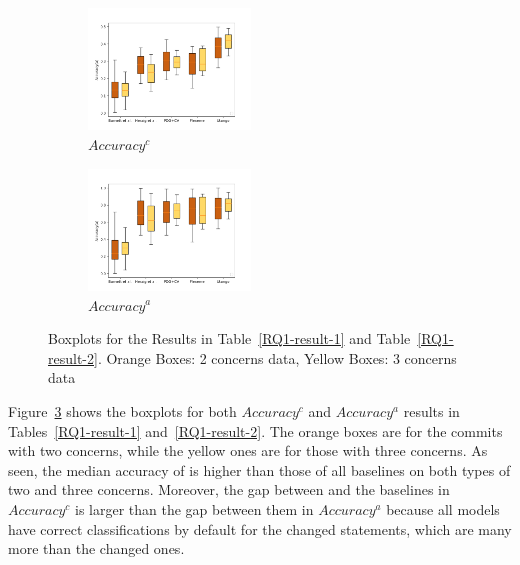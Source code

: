\begin{figure}
	\centering
	\begin{subfigure}{0.235\textwidth}
		\centering
		\includegraphics[width=1.7in]{figures/RQ_1_1.png}
                \vspace{-16pt}
		\caption{$Accuracy^c$}
		\label{RQ1-result-3-1}
	\end{subfigure}
	\begin{subfigure}{0.235\textwidth}
		\centering
		\includegraphics[width=1.7in]{figures/RQ_1_2.png}
                \vspace{-16pt}
		\caption{$Accuracy^a$}
		\label{RQ1-result-3-2}
	\end{subfigure}
        \vspace{-12pt}
	\caption{Boxplots for the Results in Table~\ref{RQ1-result-1} and Table~\ref{RQ1-result-2}. Orange Boxes: 2 concerns data, Yellow Boxes: 3 concerns data}
	\label{RQ1-result-3}
\end{figure}

Figure~\ref{RQ1-result-3} shows the boxplots for both $Accuracy^c$ and
$Accuracy^a$ results in Tables~\ref{RQ1-result-1}
and~\ref{RQ1-result-2}. The orange boxes are for the commits with two
concerns, while the yellow ones are for those with three concerns. As
seen, the median accuracy of {\tool} is higher than those of all
baselines on both types of two and three concerns. Moreover, the gap
between {\tool} and the baselines in $Accuracy^{c}$ is larger than the
gap between them in $Accuracy^{a}$ because all models have correct
classifications by default for the changed statements, which are many
more than the changed ones.


